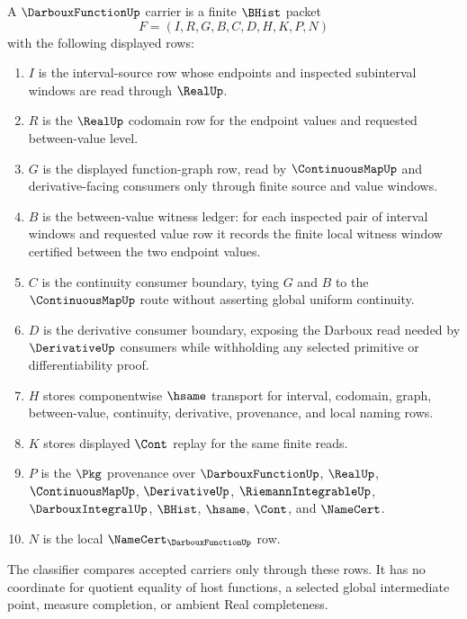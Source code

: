 \begin{definition}
\label{def:darboux-function-carrier}
A $\DarbouxFunctionUp$ carrier is a finite $\BHist$ packet
$$
F=(I,R,G,B,C,D,H,K,P,N)
$$
with the following displayed rows:
\begin{enumerate}
\item $I$ is the interval-source row whose endpoints and inspected subinterval windows are read through $\RealUp$.
\item $R$ is the $\RealUp$ codomain row for the endpoint values and requested between-value level.
\item $G$ is the displayed function-graph row, read by $\ContinuousMapUp$ and derivative-facing consumers only through finite source and value windows.
\item $B$ is the between-value witness ledger: for each inspected pair of interval windows and requested value row it records the finite local witness window certified between the two endpoint values.
\item $C$ is the continuity consumer boundary, tying $G$ and $B$ to the $\ContinuousMapUp$ route without asserting global uniform continuity.
\item $D$ is the derivative consumer boundary, exposing the Darboux read needed by $\DerivativeUp$ consumers while withholding any selected primitive or differentiability proof.
\item $H$ stores componentwise $\hsame$ transport for interval, codomain, graph, between-value, continuity, derivative, provenance, and local naming rows.
\item $K$ stores displayed $\Cont$ replay for the same finite reads.
\item $P$ is the $\Pkg$ provenance over $\DarbouxFunctionUp$, $\RealUp$, $\ContinuousMapUp$, $\DerivativeUp$, $\RiemannIntegrableUp$, $\DarbouxIntegralUp$, $\BHist$, $\hsame$, $\Cont$, and $\NameCert$.
\item $N$ is the local $\NameCert_{\DarbouxFunctionUp}$ row.
\end{enumerate}
The classifier compares accepted carriers only through these rows. It has no coordinate for quotient equality of host functions, a selected global intermediate point, measure completion, or ambient Real completeness.
\end{definition}

